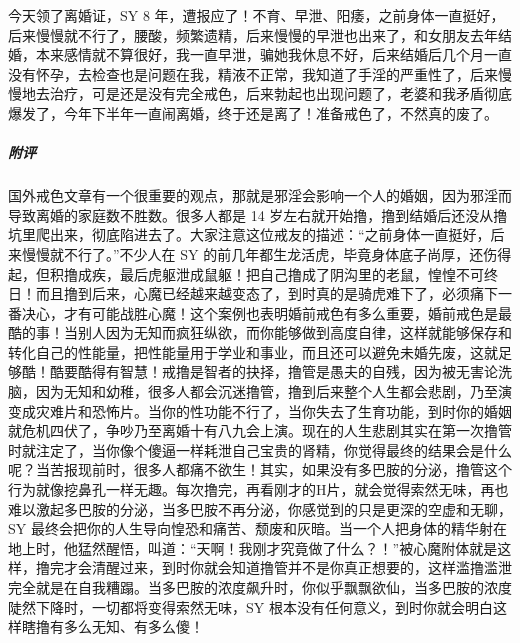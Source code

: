 \begin{case}
    今天领了离婚证，SY 8 年，遭报应了！不育、早泄、阳痿，之前身体一直挺好，后来慢慢就不行了，腰酸，频繁遗精，后来慢慢的早泄也出来了，和女朋友去年结婚，本来感情就不算很好，我一直早泄，骗她我休息不好，后来结婚后几个月一直没有怀孕，去检查也是问题在我，精液不正常，我知道了手淫的严重性了，后来慢慢地去治疗，可是还是没有完全戒色，后来勃起也出现问题了，老婆和我矛盾彻底爆发了，今年下半年一直闹离婚，终于还是离了！准备戒色了，不然真的废了。
    \subparagraph{附评} 国外戒色文章有一个很重要的观点，那就是邪淫会影响一个人的婚姻，因为邪淫而导致离婚的家庭数不胜数。很多人都是 14 岁左右就开始撸，撸到结婚后还没从撸坑里爬出来，彻底陷进去了。大家注意这位戒友的描述：“之前身体一直挺好，后来慢慢就不行了。”不少人在 SY 的前几年都生龙活虎，毕竟身体底子尚厚，还伤得起，但积撸成疾，最后虎躯泄成鼠躯！把自己撸成了阴沟里的老鼠，惶惶不可终日！而且撸到后来，心魔已经越来越变态了，到时真的是骑虎难下了，必须痛下一番决心，才有可能战胜心魔！这个案例也表明婚前戒色有多么重要，婚前戒色是最酷的事！当别人因为无知而疯狂纵欲，而你能够做到高度自律，这样就能够保存和转化自己的性能量，把性能量用于学业和事业，而且还可以避免未婚先废，这就足够酷！酷要酷得有智慧！戒撸是智者的抉择，撸管是愚夫的自残，因为被无害论洗脑，因为无知和幼稚，很多人都会沉迷撸管，撸到后来整个人生都会悲剧，乃至演变成灾难片和恐怖片。当你的性功能不行了，当你失去了生育功能，到时你的婚姻就危机四伏了，争吵乃至离婚十有八九会上演。现在的人生悲剧其实在第一次撸管时就注定了，当你像个傻逼一样耗泄自己宝贵的肾精，你觉得最终的结果会是什么呢？当苦报现前时，很多人都痛不欲生！其实，如果没有多巴胺的分泌，撸管这个行为就像挖鼻孔一样无趣。每次撸完，再看刚才的H片，就会觉得索然无味，再也难以激起多巴胺的分泌，当多巴胺不再分泌，你感觉到的只是更深的空虚和无聊，SY 最终会把你的人生导向惶恐和痛苦、颓废和灰暗。当一个人把身体的精华射在地上时，他猛然醒悟，叫道：“天啊！我刚才究竟做了什么？！”被心魔附体就是这样，撸完才会清醒过来，到时你就会知道撸管并不是你真正想要的，这样滥撸滥泄完全就是在自我糟蹋。当多巴胺的浓度飙升时，你似乎飘飘欲仙，当多巴胺的浓度陡然下降时，一切都将变得索然无味，SY 根本没有任何意义，到时你就会明白这样瞎撸有多么无知、有多么傻！
\end{case}

